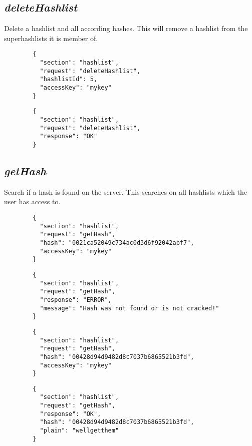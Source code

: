 \subsection*{\textit{deleteHashlist}}
	Delete a hashlist and all according hashes. This will remove a hashlist from the superhashlists it is member of.
	{
		\color{blue}
		\begin{verbatim}
		{
		  "section": "hashlist",
		  "request": "deleteHashlist",
		  "hashlistId": 5,
		  "accessKey": "mykey"
		}
		\end{verbatim}
	}
	{
		\color{OliveGreen}
		\begin{verbatim}
		{
		  "section": "hashlist",
		  "request": "deleteHashlist",
		  "response": "OK"
		}
		\end{verbatim}
	}
\subsection*{\textit{getHash}}
	Search if a hash is found on the server. This searches on all hashlists which the user has access to.
	{
		\color{blue}
		\begin{verbatim}
		{
		  "section": "hashlist",
		  "request": "getHash",
		  "hash": "0021ca52049c734ac0d3d6f92042abf7",
		  "accessKey": "mykey"
		}
		\end{verbatim}
	}
	{
		\color{OliveGreen}
		\begin{verbatim}
		{
		  "section": "hashlist",
		  "request": "getHash",
		  "response": "ERROR",
		  "message": "Hash was not found or is not cracked!"
		}
		\end{verbatim}
	}
	{
		\color{blue}
		\begin{verbatim}
		{
		  "section": "hashlist",
		  "request": "getHash",
		  "hash": "00428d94d9482d8c7037b6865521b3fd",
		  "accessKey": "mykey"
		}
		\end{verbatim}
	}
	{
		\color{OliveGreen}
		\begin{verbatim}
		{
		  "section": "hashlist",
		  "request": "getHash",
		  "response": "OK",
		  "hash": "00428d94d9482d8c7037b6865521b3fd",
		  "plain": "wellgetthem"
		}
		\end{verbatim}
	}







 